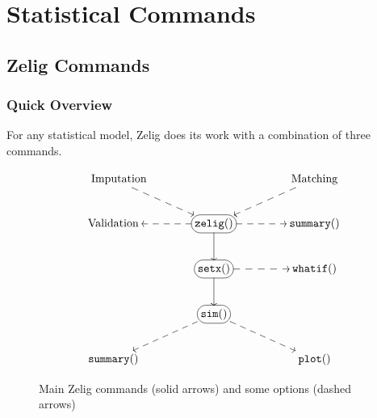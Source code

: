 \chapter{Statistical Commands}

\section{Zelig Commands}\label{s:commands}
  
\subsection{Quick Overview}\label{overview}
  
For any statistical model, Zelig does its work with a combination of
three commands.  

\begin{figure}[h!]
\caption{Main Zelig commands (solid arrows) and some options (dashed arrows)}
\label{3steps}
\begin{center}
\begin{displaymath}
\SelectTips{eu}{12} \UseTips 
\xymatrix@!C{\quad {\rm Imputation}
\ar@{-->}[dr] & & {\rm Matching} \ar@{-->}[dl] \\ 
{\rm Validation } \ar@{<--}[r] & *+[F-:<10pt>]{{\tt zelig()}} \ar@{->}[d] \ar@{-->}[r] &
{\tt summary()}\\ 
 & *+[F-:<10pt>]{{\tt setx()}}  \ar@{-->}[r] \ar@{->}[d] & {\tt whatif()}\\ 
& *+[F-:<10pt>]{{\tt sim()}} \ar@{-->}[dr] \ar@{-->}[dl] & \\
{\tt summary()} & &{\tt plot()} } 
\end{displaymath}
\end{center}
\end{figure}


